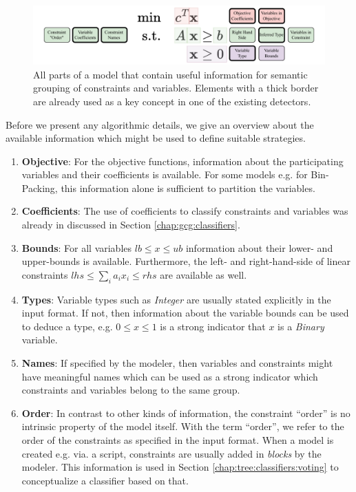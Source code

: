 		\begin{figure}[ht!]
			\centering
			\includegraphics[scale=0.8]{Bilder/DrawIO/model_information}
			\caption{All parts of a model that contain useful information for semantic grouping of constraints and variables. Elements with a thick border are already used as a key concept in one of the existing detectors.}
			\label{fig:tree:information}
		\end{figure}

		Before we present any algorithmic details, we give an overview about the available information which might be used to define suitable strategies. 

		\begin{enumerate}
			\item \textbf{Objective}: For the objective functions, information about the participating variables and their coefficients is available. For some models e.g. for Bin-Packing, this information alone is sufficient to partition the variables.
			\item \textbf{Coefficients}:
			The use of coefficients to classify constraints and variables was already in discussed in Section \ref{chap:gcg:classifiers}.
			\item \textbf{Bounds}: For all variables $lb \leq x \leq ub$ information about their lower- and upper-bounds is available.
			Furthermore, the left- and right-hand-side of linear constraints $lhs \leq \sum_i a_i x_i \leq rhs$ are available as well.
			\item \textbf{Types}: Variable types such as \textit{Integer} are usually stated explicitly in the input format. If not, then information about the variable bounds can be used to deduce a type, e.g. $0 \leq x \leq 1$ is a strong indicator that $x$ is a \textit{Binary} variable.
			\item \textbf{Names}: If specified by the modeler, then variables and constraints might have meaningful names which can be used as a strong indicator which constraints and variables belong to the same group.
			\item \textbf{Order}: In contrast to other kinds of information, the constraint \enquote{order} is no intrinsic property of the model itself. With the term \enquote{order}, we refer to the order of the constraints as specified in the input format. When a model is created e.g. via. a script, constraints are usually added in \textit{blocks} by the modeler. This information is used in Section \ref{chap:tree:classifiers:voting} to conceptualize a classifier based on that.
		\end{enumerate}

